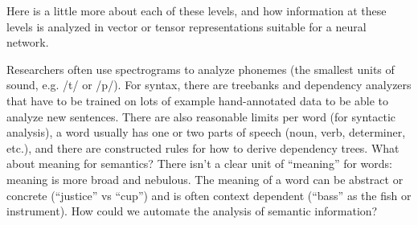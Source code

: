 Here is a little more about each of these levels, and how information at these levels is analyzed in vector or tensor representations suitable for a neural network.







Researchers often use spectrograms to analyze phonemes (the smallest units of sound, e.g. /t/ or /p/). For syntax, there are treebanks and dependency analyzers that have to be trained on lots of example hand-annotated data to be able to analyze new sentences. There are also reasonable limits per word (for syntactic analysis), a word usually has one or two parts of speech (noun, verb, determiner, etc.), and there are constructed rules for how to derive dependency trees. What about meaning for semantics? There isn't a clear unit of ``meaning'' for words: meaning is more broad and nebulous. The meaning of a word can be abstract or concrete (``justice'' vs ``cup'') and is often context dependent (``bass'' as the fish or instrument). How could we automate the analysis of semantic information?

